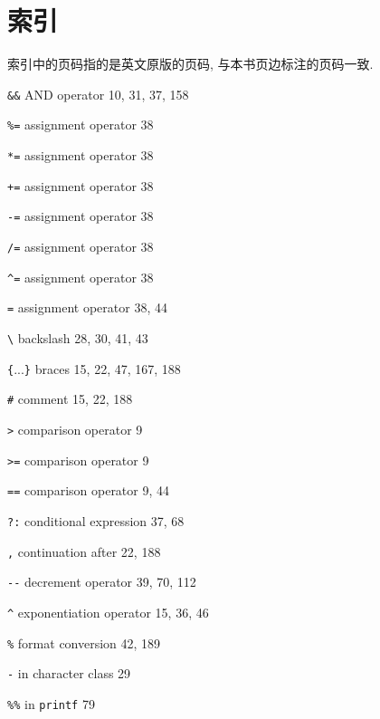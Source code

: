 \chapter{索引}
\label{chap:index}

索引中的页码指的是英文原版的页码, 与本书页边标注的页码一致.

\begin{multicols}{3}
\small
\hangindent=4pc  \verb'&&' AND operator 10, 31, 37, 158

\hangindent=4pc  \verb'%=' assignment operator 38

\hangindent=4pc  \verb'*=' assignment operator 38

\hangindent=4pc  \verb'+=' assignment operator 38

\hangindent=4pc  \verb'-=' assignment operator 38

\hangindent=4pc  \verb'/=' assignment operator 38

\hangindent=4pc  \verb'^=' assignment operator 38

\hangindent=4pc  \verb'=' assignment operator 38, 44

\hangindent=4pc  \verb'\' backslash 28, 30, 41, 43

\hangindent=4pc  \verb'{'...\verb'}' braces 15, 22, 47, 167, 188

\hangindent=4pc  \verb'#' comment 15, 22, 188

\hangindent=4pc  \verb'>' comparison operator 9

\hangindent=4pc  \verb'>=' comparison operator 9

\hangindent=4pc  \verb'==' comparison operator 9, 44

\hangindent=4pc  \verb'?:' conditional expression 37, 68

\hangindent=4pc  \verb',' continuation after 22, 188

\hangindent=4pc  \verb'--' decrement operator 39, 70, 112

\hangindent=4pc  \verb'^' exponentiation operator 15, 36, 46

\hangindent=4pc  \verb'%' format conversion 42, 189

\hangindent=4pc  \verb'-' in character class 29

\hangindent=4pc  \verb'%%' in \verb'printf' 79


\end{multicols}
